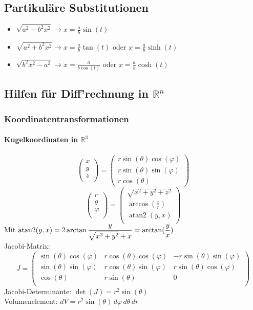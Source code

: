 \documentclass[a4paper, 9pt, DIV=24]{scrartcl}
\newcommand{\R}{\mathbb{R}}
\begin{document}
\subsection{Partikuläre Substitutionen}
\begin{itemize}
\item $\sqrt{a^2-b^2x^2} \rightarrow x=\frac{a}{b} \sin(t)$
\item $\sqrt{a^2+b^2x^2} \rightarrow x=\frac{a}{b} \tan (t) \mbox{ oder } x=\frac{a}{b} \sinh(t)$
\item $\sqrt{b^2x^2-a^2} \rightarrow x=\frac{a}{b\cos(t)} \mbox{ oder } x=\frac{a}{b} \cosh(t)$
\end{itemize}

\subsection{Hilfen für Diff'rechnung in $\mathbb{R}^n$}
\subsubsection{Koordinatentransformationen}
\paragraph{Kugelkoordinaten in $\R^3$}
\[
\begin{pmatrix}
 x \\ y \\ z \\
\end{pmatrix}
=
\begin{pmatrix}
 r\sin(\theta)\cos(\varphi) \\
 r\sin(\theta)\sin(\varphi) \\
 r\cos(\theta)
\end{pmatrix}
\]
\[
\begin{pmatrix}
  r \\ \theta \\ \varphi \\
\end{pmatrix}
=
\begin{pmatrix}
  \sqrt{x^2 + y^2 + z^2} \\
  \arccos(\frac{z}{r}) \\
  \operatorname{atan2} (y, x) \\
\end{pmatrix}
\]
Mit $\operatorname{atan2} (y, x)= 2 \arctan \dfrac{y}{\sqrt{x^2+y^2}+x} = \arctan(\dfrac{y}{x}) \\$\\
Jacobi-Matrix:
\[
J =
\begin{pmatrix}
 \sin(\theta)\cos(\varphi) & r\cos(\theta)\cos(\varphi) & -r\sin(\theta)\sin(\varphi) \\
 \sin(\theta)\sin(\varphi) & r\cos(\theta)\sin(\varphi) & r\sin(\theta)\cos(\varphi) \\
 \cos(\theta) & r\sin(\theta) & 0 \\
\end{pmatrix}
\]
Jacobi-Determinante: $\det(J) = r^2\sin(\theta)$\\
Volumenelement: $dV = r^2\sin(\theta)\, d\varphi\, d\theta\, dr$
\end{document}
